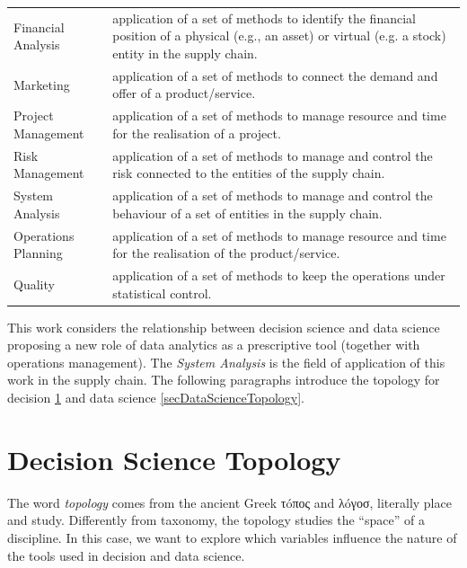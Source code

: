 \begin{table}[]
{\begin{tabular}{ll}
Financial Analysis                 & application of a set of methods to identify the financial position of a physical (e.g., an asset) or virtual (e.g. a stock) entity in the supply chain. \\
Marketing                          & application of a set of methods to connect the demand and offer of a product/service.                                                                   \\
Project Management                 & application of a set of methods to manage resource and time for the realisation of a project.                                                           \\
Risk Management                    & application of a set of methods to manage and control the risk connected to the entities of the supply chain.                                           \\
System Analysis                    & application of a set of methods to manage and control the behaviour of a set of entities in the supply chain.                                           \\
Operations Planning                & application of a set of methods to manage resource and time for the realisation of the product/service.                                                 \\
Quality                            & application of a set of methods   to keep the operations under statistical control.                                                                     \\ \hline
\end{tabular}%
}
\end{table}

This work considers the relationship between decision science and data science proposing a new role of data analytics as a prescriptive tool (together with operations management). The \textit{System Analysis} is the field of application of this work in the supply chain. The following paragraphs introduce the topology for decision \ref{secDecScienceTopology} and data science \ref{secDataScienceTopology}.

\section{Decision Science Topology} \label{secDecScienceTopology}
The word \textit{topology} comes from the ancient Greek \textgreek{τóπος} and \textgreek{λóγοσ}, literally place and study. Differently from taxonomy, the topology studies the “space” of a discipline. In this case, we want to explore which variables influence the nature of the tools used in decision and data science.\par

